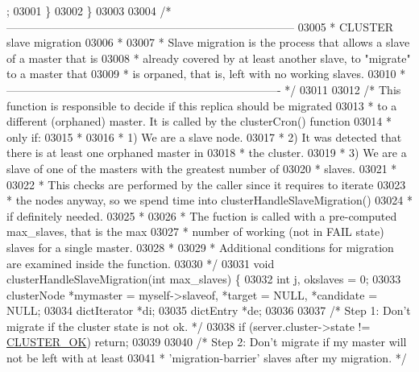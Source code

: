 \begin{DoxyCode}
{{{{{{{{{{{{{{{{{{{{{{{{{{{{{{{{{{{{{{{{{{{{{{{{{{{{{{{{      ;
03001     \}
03002 \}
03003 
03004 \textcolor{comment}{/* -----------------------------------------------------------------------------}
03005 \textcolor{comment}{ * CLUSTER slave migration}
03006 \textcolor{comment}{ *}
03007 \textcolor{comment}{ * Slave migration is the process that allows a slave of a master that is}
03008 \textcolor{comment}{ * already covered by at least another slave, to "migrate" to a master that}
03009 \textcolor{comment}{ * is orpaned, that is, left with no working slaves.}
03010 \textcolor{comment}{ * ------------------------------------------------------------------------- */}
03011 
03012 \textcolor{comment}{/* This function is responsible to decide if this replica should be migrated}
03013 \textcolor{comment}{ * to a different (orphaned) master. It is called by the clusterCron() function}
03014 \textcolor{comment}{ * only if:}
03015 \textcolor{comment}{ *}
03016 \textcolor{comment}{ * 1) We are a slave node.}
03017 \textcolor{comment}{ * 2) It was detected that there is at least one orphaned master in}
03018 \textcolor{comment}{ *    the cluster.}
03019 \textcolor{comment}{ * 3) We are a slave of one of the masters with the greatest number of}
03020 \textcolor{comment}{ *    slaves.}
03021 \textcolor{comment}{ *}
03022 \textcolor{comment}{ * This checks are performed by the caller since it requires to iterate}
03023 \textcolor{comment}{ * the nodes anyway, so we spend time into clusterHandleSlaveMigration()}
03024 \textcolor{comment}{ * if definitely needed.}
03025 \textcolor{comment}{ *}
03026 \textcolor{comment}{ * The fuction is called with a pre-computed max\_slaves, that is the max}
03027 \textcolor{comment}{ * number of working (not in FAIL state) slaves for a single master.}
03028 \textcolor{comment}{ *}
03029 \textcolor{comment}{ * Additional conditions for migration are examined inside the function.}
03030 \textcolor{comment}{ */}
03031 \textcolor{keywordtype}{void} clusterHandleSlaveMigration(\textcolor{keywordtype}{int} max\_slaves) \{
03032     \textcolor{keywordtype}{int} j, okslaves = 0;
03033     clusterNode *mymaster = myself->slaveof, *target = NULL, *candidate = NULL;
03034     dictIterator *di;
03035     dictEntry *de;
03036 
03037     \textcolor{comment}{/* Step 1: Don't migrate if the cluster state is not ok. */}
03038     \textcolor{keywordflow}{if} (server.cluster->state != \hyperlink{cluster_8h_adbda03922c45cac3cfc98a5c34a9d2d2}{CLUSTER\_OK}) \textcolor{keywordflow}{return};
03039 
03040     \textcolor{comment}{/* Step 2: Don't migrate if my master will not be left with at least}
03041 \textcolor{comment}{     *         'migration-barrier' slaves after my migration. */}
}}}}}}}}}}}}}}}}}}}}}}}}}}}}}}}}}}}}}}}}}}}}}}}}}}}}}}}}
\end{DoxyCode}
